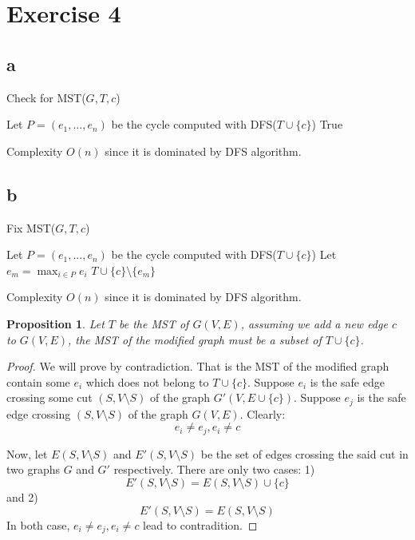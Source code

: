 \documentclass[a4paper,10pt,twoside]{article}
\newtheorem{proof}{Proof}
\newtheorem{proposition}{Proposition}
\begin{document}
\section*{Exercise 4}
\subsection*{a}

\begin{algorithm}[H]
	\caption{Check for MST($G, T, c$)}
	Let $P=(e_1, ..., e_n)$ be the cycle computed with DFS($T \cup \{c\}$)\;
	{
		\Return True 
	}

\end{algorithm}

Complexity $O(n)$ since it is dominated by DFS algorithm.

\subsection*{b}
\begin{algorithm}[H]
	\caption{Fix MST($G, T, c$)}
	Let $P=(e_1, ..., e_n)$ be the cycle computed with DFS($T \cup \{c\}$)\;
	Let $e_m = \max_{i\in P} e_i$\;
	\Return $T \cup \{c\} \setminus \{e_m\}$ 

\end{algorithm}

Complexity $O(n)$ since it is dominated by DFS algorithm.


\begin{proposition}
	Let $T$ be the MST of $G(V, E)$, assuming we add a new edge $c$ to $G(V, E)$, the
	MST of the modified graph must be a subset of $T\cup \{c\}$.
\end{proposition}
\begin{proof}
	We will prove by contradiction. That is the MST of the modified graph contain some $e_i$ which
	does not belong to $T \cup \{c\}$. Suppose $e_i$ is the safe edge crossing some cut 
	$(S, V\setminus S)$ of the graph $G'(V, E \cup \{c\})$. Suppose $e_j$ is the safe edge
	crossing $(S, V\setminus S)$ of the graph $G(V, E)$. Clearly:
	\[
		e_i \neq e_j, e_i \neq c
	\]

	Now, let $E(S, V\setminus S)$ and $E'(S, V\setminus S)$ be the set of edges crossing
	the said cut in two graphs $G$ and $G'$ respectively. There are only two cases: 
	1) 
	$$E'(S, V\setminus S)=E(S, V\setminus S) \cup \{c\}$$ and 2) 
	$$E'(S, V\setminus S)=E(S, V\setminus S)$$
	In both case, $e_i \neq e_j, e_i \neq c$
	lead to contradition.

\end{proof}
\end{document}
